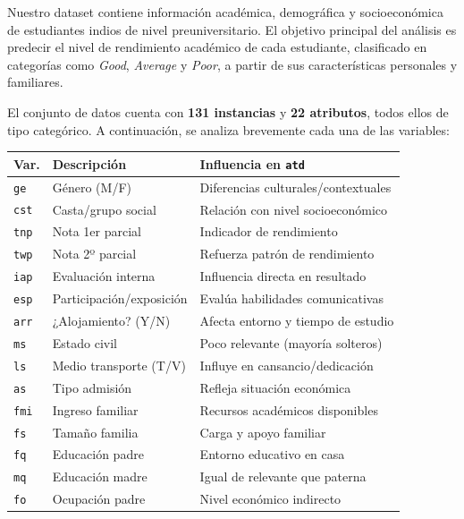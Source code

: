 \documentclass[11pt,a4paper]{article}
\begin{document}
Nuestro dataset contiene información académica, demográfica y socioeconómica de estudiantes indios de nivel preuniversitario. El objetivo principal del análisis es predecir el nivel de rendimiento académico de cada estudiante, clasificado en categorías como \textit{Good}, \textit{Average} y \textit{Poor}, a partir de sus características personales y familiares.

\medskip

El conjunto de datos cuenta con \textbf{131 instancias} y \textbf{22 atributos}, todos ellos de tipo categórico. A continuación, se analiza brevemente cada una de las variables:

\begin{table}[H]
\centering
\footnotesize
\renewcommand{\arraystretch}{1.1}
\begin{tabularx}{\textwidth}{|l|X|X|}
\hline
\textbf{Var.} & \textbf{Descripción} & \textbf{Influencia en \texttt{atd}} \\
\hline
\texttt{ge} & Género (M/F) & Diferencias culturales/contextuales \\
\texttt{cst} & Casta/grupo social & Relación con nivel socioeconómico \\
\texttt{tnp} & Nota 1er parcial & Indicador de rendimiento \\
\texttt{twp} & Nota 2º parcial & Refuerza patrón de rendimiento \\
\texttt{iap} & Evaluación interna & Influencia directa en resultado \\
\texttt{esp} & Participación/exposición & Evalúa habilidades comunicativas \\
\texttt{arr} & ¿Alojamiento? (Y/N) & Afecta entorno y tiempo de estudio \\
\texttt{ms} & Estado civil & Poco relevante (mayoría solteros) \\
\texttt{ls} & Medio transporte (T/V) & Influye en cansancio/dedicación \\
\texttt{as} & Tipo admisión & Refleja situación económica \\
\texttt{fmi} & Ingreso familiar & Recursos académicos disponibles \\
\texttt{fs} & Tamaño familia & Carga y apoyo familiar \\
\texttt{fq} & Educación padre & Entorno educativo en casa \\
\texttt{mq} & Educación madre & Igual de relevante que paterna \\
\texttt{fo} & Ocupación padre & Nivel económico indirecto \\

\end{tabularx}
\end{table}
\end{document}
